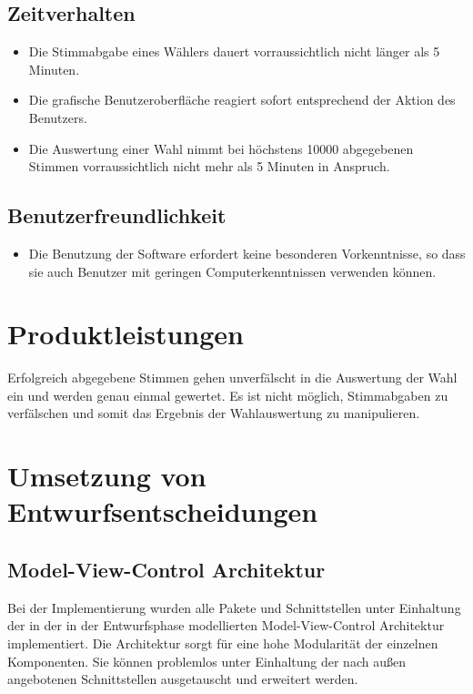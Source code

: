 \documentclass[parskip=full]{scrartcl}
\begin{document}
\subsection{Zeitverhalten}

\begin{itemize}
	\item Die Stimmabgabe eines Wählers dauert vorraussichtlich nicht länger als 5 Minuten.
	\item Die grafische Benutzeroberfläche reagiert sofort entsprechend der Aktion des Benutzers.
	\item Die Auswertung einer Wahl nimmt bei höchstens 10000 abgegebenen Stimmen vorraussichtlich nicht mehr als 5 Minuten in Anspruch.
\end{itemize}

\subsection{Benutzerfreundlichkeit}
\begin{itemize}
	\item Die Benutzung der Software erfordert keine besonderen Vorkenntnisse, so dass sie auch Benutzer mit geringen Computerkenntnissen verwenden können.
\end{itemize}

\section{Produktleistungen}
Erfolgreich abgegebene Stimmen gehen unverfälscht in die Auswertung der Wahl ein und werden genau einmal gewertet. Es ist nicht möglich, Stimmabgaben zu verfälschen und somit das Ergebnis der Wahlauswertung zu manipulieren.
		
\section{Umsetzung von Entwurfsentscheidungen}
\subsection{Model-View-Control Architektur}
Bei der Implementierung wurden alle Pakete und Schnittstellen unter Einhaltung der in der in der Entwurfsphase modellierten Model-View-Control Architektur implementiert. Die Architektur sorgt für eine hohe Modularität der einzelnen Komponenten. Sie können problemlos unter Einhaltung der nach außen angebotenen Schnittstellen ausgetauscht und erweitert werden. 
\end{document}
